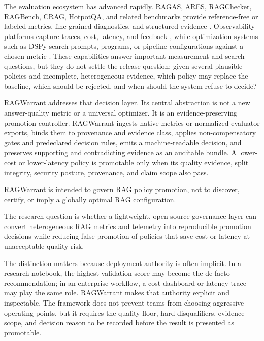 \documentclass[11pt]{article}
\begin{document}
The evaluation ecosystem has advanced rapidly. RAGAS, ARES, RAGChecker,
RAGBench, CRAG, HotpotQA, and related benchmarks provide reference-free
or labeled metrics, fine-grained diagnostics, and structured evidence
\cite{es2023ragas,saadfalcon2023ares,ru2024ragchecker,friel2024ragbench,yang2024crag,yang2018hotpotqa,chen2024benchmarking}. Observability platforms capture traces, cost, latency,
and feedback \cite{langsmith2026,phoenix2026}, while optimization systems such as DSPy
search prompts, programs, or pipeline configurations against a chosen
metric \cite{khattab2023dspy}. These capabilities answer important measurement and
search questions, but they do not settle the release question: given
several plausible policies and incomplete, heterogeneous evidence, which
policy may replace the baseline, which should be rejected, and when
should the system refuse to decide?

RAGWarrant addresses that decision layer. Its central abstraction is not
a new answer-quality metric or a universal optimizer. It is an
evidence-preserving promotion controller. RAGWarrant ingests native
metrics or normalized evaluator exports, binds them to provenance and
evidence class, applies non-compensatory gates and predeclared decision
rules, emits a machine-readable decision, and preserves supporting and
contradicting evidence as an auditable bundle. A lower-cost or
lower-latency policy is promotable only when its quality evidence, split
integrity, security posture, provenance, and claim scope also pass.

RAGWarrant is intended to govern RAG policy promotion, not to discover,
certify, or imply a globally optimal RAG configuration.

The research question is whether a lightweight, open-source governance
layer can convert heterogeneous RAG metrics and telemetry into
reproducible promotion decisions while reducing false promotion of
policies that save cost or latency at unacceptable quality risk.

The distinction matters because deployment authority is often implicit.
In a research notebook, the highest validation score may become the de
facto recommendation; in an enterprise workflow, a cost dashboard or
latency trace may play the same role. RAGWarrant makes that authority
explicit and inspectable. The framework does not prevent teams from
choosing aggressive operating points, but it requires the quality floor,
hard disqualifiers, evidence scope, and decision reason to be recorded
before the result is presented as promotable.
\end{document}
